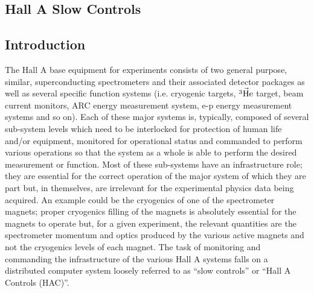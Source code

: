 \subsection{Hall A Slow Controls}

\subsection{Introduction}
The Hall A base equipment for experiments consists of two general purpose, 
similar, superconducting spectrometers and their associated detector packages as well as
several specific function systems (i.e. cryogenic targets, $\vec{\rm ^3He}$ target, beam current monitors,
ARC energy measurement system, e-p energy measurement systems and so on).
Each of these major systems is, typically, composed of several sub-system levels which need
to be interlocked for protection of human life and/or equipment, monitored for operational status and
commanded to perform various operations so that the system as a whole is able to perform the desired measurement
or function.
Most of these sub-systems have an infrastructure role; they are essential for the correct operation
of the major system of which they are part but, in themselves, are irrelevant for the experimental
physics data being acquired.
An example could be the cryogenics of one of the spectrometer magnets; proper cryogenics filling of the magnets
is absolutely essential for the magnets to operate but, for a given experiment, the relevant quantities are 
the spectrometer momentum and optics produced by the various active magnets and not the cryogenics
levels of each magnet.
The task of monitoring and commanding the infrastructure of the various Hall A systems
falls on a distributed computer system loosely referred to as ``slow controls'' or
``Hall A Controls (HAC)''. 

